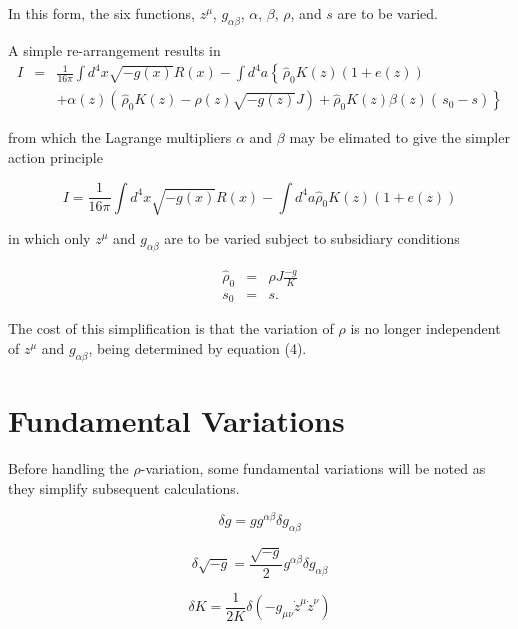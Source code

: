 In this form, the six functions, $z^{\mu}$, $g_{\alpha \beta}$, $\alpha$, $\beta$, $\rho$, and $s$ are to be varied.

A simple re-arrangement results in
\begin{eqnarray}
I &=& \frac{1}{16\pi} \int d^4x \sqrt{-g(x)} R(x) - \int d^4a \left\{ \frac{}{} {\hat \rho}_{0} K(z) \left(1 + e(z) \right) \right. \nonumber \\
& & \left.  + \alpha(z) \left( \frac{}{} {\hat \rho}_{0} K(z) - \rho(z) \sqrt{-g(z)} J \right) + {\hat \rho}_{0} K(z) \beta(z) \left( \frac{}{} s_{0} - s \right) \right\}
\end{eqnarray}

from which the Lagrange multipliers $\alpha$ and $\beta$ may be elimated to give the simpler action principle 

\begin{equation}
I = \frac{1}{16\pi} \int d^4x \sqrt{-g(x)} R(x) - \int d^4a {\hat \rho}_{0} K(z) (1 + e(z))
\end{equation}

in which only $z^{\mu}$ and $g_{\alpha \beta}$ are to be varied subject to subsidiary conditions 

\begin{eqnarray}
{\hat \rho}_{0} &=& \rho J \frac{-g}{K} \\
s_0 &=& s.
\end{eqnarray}

The cost of this simplification is that the variation of $\rho$ is no longer independent of $z^{\mu}$ and $g_{\alpha \beta}$, being determined by equation (4).

\section{Fundamental Variations}

Before handling the $\rho$-variation, some fundamental variations will be noted as they simplify subsequent calculations.

\begin{equation}
\delta g = g g^{\alpha \beta} \delta g_{\alpha \beta}
\end{equation}

\begin{equation}
\delta \sqrt{-g} = \frac{\sqrt{-g}}{2} g^{\alpha \beta} \delta g_{\alpha \beta}
\end{equation}

\begin{equation}
\delta K = \frac{1}{2 K} \delta \left( -g_{\mu\nu} {\dot z}^{\mu} {\dot z}^{\nu} \right)
\end{equation}

